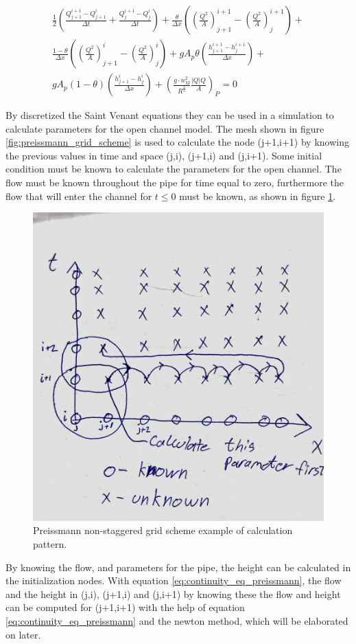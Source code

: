 \begin{multline}
	\frac{1}{2} \left(\frac{Q_{j+1}^{i+1}-Q_{j+1}^i}{\Delta t}+\frac{Q_{j}^{i+1} - Q_j^i}{\Delta t}\right) + \frac{\theta}{\Delta x} \left(\left(\frac{Q^2}{A}\right)_{j+1}^{i+1}-\left(\frac{Q^2}{A}\right)_{j}^{i+1}\right) + \\ \frac{1-\theta}{\Delta x}\left(\left(\frac{Q^2}{A}\right)_{j+1}^{i}-\left(\frac{Q^2}{A}\right)_{j}^{i}\right)+gA_p\theta \left(\frac{h_{j+1}^{i+1}-h_j^{i+1}}{\Delta x}\right)+ \\ gA_p(1-\theta)\left(\frac{h_{j+1}^{i} - h_j^i}{\Delta x}\right)+\left(\frac{g\cdot n_M^2}{R^\frac{4}{3}}\frac{|Q|Q}{A}\right)_P = 0 
\end{multline}

By discretized the Saint Venant equations they can be used in a simulation to calculate parameters for the open channel model. The mesh shown in figure \ref{fig:preissmann_grid_scheme} is used to calculate the node (j+1,i+1) by knowing the previous values in time and space (j,i), (j+1,i) and (j,i+1). Some initial condition must be known to calculate the parameters for the open channel. The flow must be known throughout the pipe for time equal to zero, furthermore the flow that will enter the channel for $t\leq 0$ must be known, as shown in figure \ref{fig:preissmann_grid_scheme_exampel}.   

\begin{figure}[H]
\centering
\includegraphics[width=.6\textwidth]{report/modeling/pictures/preissmann_scheme_exempel}
\caption{Preissmann non-staggered grid scheme example of calculation pattern.}
\label{fig:preissmann_grid_scheme_exampel}
\end{figure} 

By knowing the flow, and parameters for the pipe, the height can be calculated in the initialization nodes. With equation \ref{eq:continuity_eq_preissmann}, the flow and the height in (j,i), (j+1,i) and (j,i+1) by knowing these the flow and height can be computed for (j+1,i+1) with the help of equation \ref{eq:continuity_eq_preissmann} and the newton method, which will be elaborated on later.  

